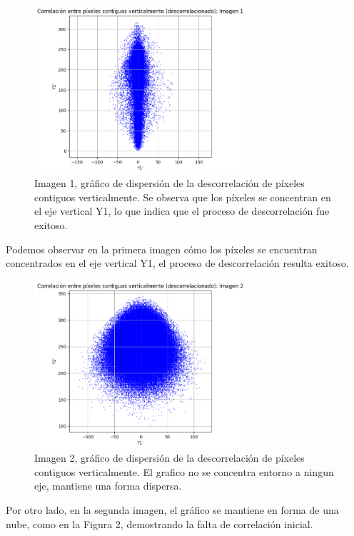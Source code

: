 \documentclass[a4paper,12pt]{article}
\begin{document}
\begin{figure}[H]
    \centering
    \includegraphics[width=0.7\textwidth]{Ejercicio1c.png}
    \caption{Imagen 1, gráfico de dispersión de la descorrelación de píxeles contiguos verticalmente. Se observa que los píxeles se concentran en el eje vertical Y1, lo que indica que el proceso de descorrelación fue exitoso.}
    \label{fig:descorrelacion1}
\end{figure}
\vspace{-1em}
Podemos observar en la primera imagen cómo los píxeles se encuentran concentrados en el eje vertical Y1, el proceso de descorrelación resulta exitoso.
\vspace{-1em}
\begin{figure}[H]
    \centering
    \includegraphics[width=0.7\textwidth]{Ejercicio1d.png}
    \caption{Imagen 2, gráfico de dispersión de la descorrelación de píxeles contiguos verticalmente. El grafico no se concentra entorno a ningun eje, mantiene una forma dispersa.}
    \label{fig:descorrelacion2}
\end{figure}

Por otro lado, en la segunda imagen, el gráfico se mantiene en forma de una nube, como en la Figura 2, demostrando la falta de correlación inicial.
\newpage
\end{document}

